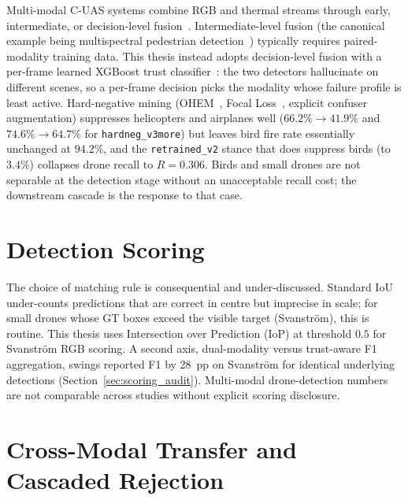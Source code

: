 Multi-modal C-UAS systems combine RGB and thermal streams through early, intermediate, or decision-level fusion~\cite{ramachandram2017fusion}. Intermediate-level fusion (the canonical example being multispectral pedestrian detection~\cite{wagner2016multispectral}) typically requires paired-modality training data. This thesis instead adopts decision-level fusion with a per-frame learned XGBoost trust classifier~\cite{chen2016xgboost,friedman2001greedy}: the two detectors hallucinate on different scenes, so a per-frame decision picks the modality whose failure profile is least active. Hard-negative mining (OHEM~\cite{shrivastava2016ohem}, Focal Loss~\cite{lin2017focal}, explicit confuser augmentation) suppresses helicopters and airplanes well ($66.2\% \to 41.9\%$ and $74.6\% \to 64.7\%$ for \texttt{hardneg\_v3more}) but leaves bird fire rate essentially unchanged at $94.2\%$, and the \texttt{retrained\_v2} stance that does suppress birds (to $3.4\%$) collapses drone recall to $R=0.306$. Birds and small drones are not separable at the detection stage without an unacceptable recall cost; the downstream cascade is the response to that case.

\section{Detection Scoring}
\label{sec:lit_calibration}

The choice of matching rule is consequential and under-discussed. Standard IoU under-counts predictions that are correct in centre but imprecise in scale; for small drones whose GT boxes exceed the visible target (Svanstr\"om), this is routine. This thesis uses Intersection over Prediction (IoP) at threshold $0.5$ for Svanstr\"om RGB scoring. A second axis, dual-modality versus trust-aware F1 aggregation, swings reported F1 by 28~pp on Svanstr\"om for identical underlying detections (Section~\ref{sec:scoring_audit}). Multi-modal drone-detection numbers are not comparable across studies without explicit scoring disclosure.

\section{Cross-Modal Transfer and Cascaded Rejection}
\label{sec:lit_xmodal_cascade}

